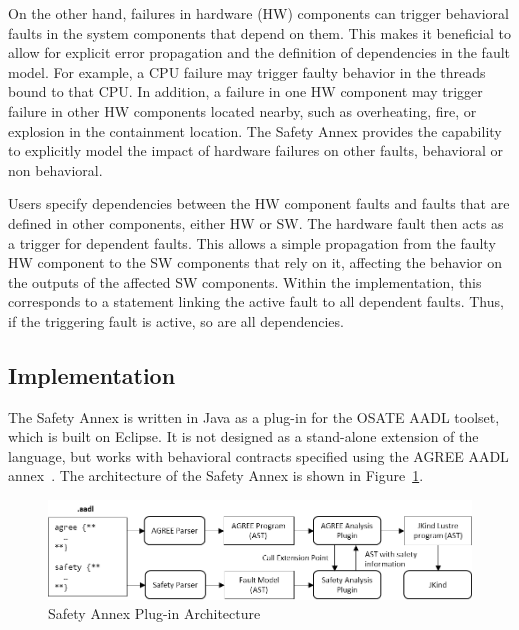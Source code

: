 On the other hand, failures in hardware (HW) components can trigger behavioral faults in the system components that depend on them. This makes it beneficial to allow for explicit error propagation and the definition of dependencies in the fault model. For example, a CPU failure may trigger faulty behavior in the threads bound to that CPU. In addition, a failure in one HW component may trigger failure in other HW components located nearby, such as overheating, fire, or explosion
in the containment location. The Safety Annex provides the capability to explicitly model the impact of hardware failures on other faults, behavioral or non behavioral. 

Users specify dependencies between the HW component faults and faults that are defined in other components, either HW or SW. The hardware fault then acts as a trigger for dependent faults. This allows a simple propagation from the faulty HW component to the SW components that rely on it, affecting the behavior on the outputs of the affected SW components. Within the implementation, this corresponds to a statement linking the active fault to all dependent faults. Thus, if the triggering fault is active, so are all dependencies.

\subsection{Implementation}
The Safety Annex is written in Java as a plug-in for the OSATE AADL toolset, which is built on Eclipse.  It is not designed as a stand-alone extension of the language, but works with behavioral contracts specified using the AGREE AADL annex~\cite{NFM2012:CoGaMiWhLaLu}. 
The architecture of the Safety Annex is shown in Figure~\ref{fig:plugin-arch}.

\begin{figure}[h!]
	\begin{center}
		\includegraphics[width=\textwidth]{images/arch.png}
	\end{center}
	\caption{Safety Annex Plug-in Architecture}
	\label{fig:plugin-arch}
\end{figure}

